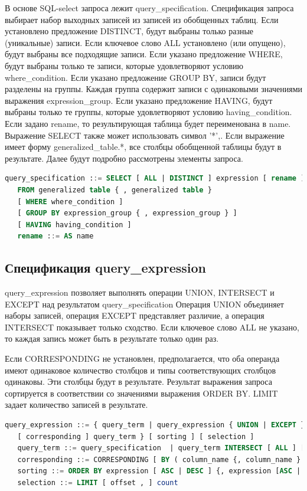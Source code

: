 В основе SQL-select запроса лежит query\_specification.
Спецификация запроса выбирает набор выходных записей из записей из обобщенных таблиц. %
Если установлено предложение DISTINCT, будут выбраны только разные (уникальные) записи. %
Если ключевое слово ALL установлено (или опущено), будут выбраны все подходящие записи.
Если указано предложение WHERE, будут выбраны только те записи, которые удовлетворяют условию where\_condition.
Если указано предложение GROUP BY, записи будут разделены на группы. 
Каждая группа содержит записи с одинаковыми значениями выражения expression\_group.
Если указано предложение HAVING, будут выбраны только те группы, которые удовлетворяют условию having\_condition.
Если задано rename, то результирующая таблица будет переименована в name.
Выражение SELECT также может использовать символ '*',.
Если выражение имеет форму generalized\_table.*, все столбцы обобщенной таблицы будут в результате. 
Далее будут подробно рассмотрены элементы запроса.

\begin{lstlisting}[language=sql, label=some-code, caption=Спецификация SQL запроса]
   query_specification ::= SELECT [ ALL | DISTINCT ] expression [ rename ] { , expression [ rename ] } 
   FROM generalized table { , generalized table } 
   [ WHERE where_condition ] 
   [ GROUP BY expression_group { , expression_group } ]
   [ HAVING having_condition ]
   rename ::= AS name
\end{lstlisting}

\subsection{Спецификация query\_expression}

query\_expression  позволяет выполнять операции UNION, INTERSECT и EXCEPT над результатом  query\_specification
Операция UNION объединяет наборы записей, 
операция EXCEPT представляет различие, 
а операция INTERSECT показывает только сходство. 
Если ключевое слово ALL не указано, то каждая запись может быть в результате только один раз.

Если CORRESPONDING не установлен, предполагается, что оба операнда имеют одинаковое количество
столбцов и типы соответствующих столбцов одинаковы. Эти столбцы будут в результате.
Результат выражения запроса сортируется в соответствии со значениями выражения ORDER BY.
LIMIT задает количество записей в результате.

\begin{lstlisting}[language=sql, label=some-code, caption=Спецификация query\_expression]
   query_expression ::= { query_term | query_expression { UNION | EXCEPT } [ ALL ] 
   [ corresponding ] query_term } [ sorting ] [ selection ]
   query_term ::= query_specification  | query_term INTERSECT [ ALL ] [ corresponding ]  query_specification
   corresponding ::= CORRESPONDING [ BY ( column_name {, column_name } ... )]
   sorting ::= ORDER BY expression [ ASC | DESC ] {, expression [ASC | DESC ] } ... 
   selection ::= LIMIT [ offset , ] count
\end{lstlisting}


